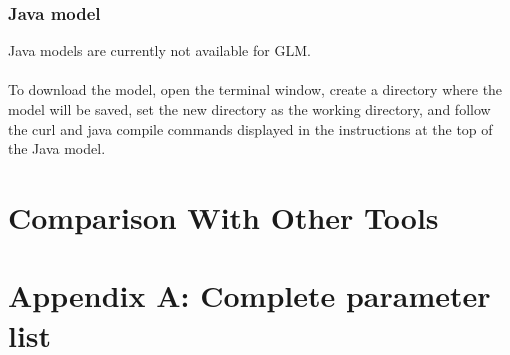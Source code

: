 \documentclass[11pt]{article}
\begin{document}
\subsubsection{Java model} 
Java models are currently not available for GLM.
\\
\\
To download the model, open the terminal window, create a directory where the model will be saved, set the new directory as the working directory, and follow the curl and java compile commands displayed in the instructions at the top of the Java model.
\section{Comparison With Other Tools}

\newpage
\section{Appendix A: Complete parameter list}
\end{document}
